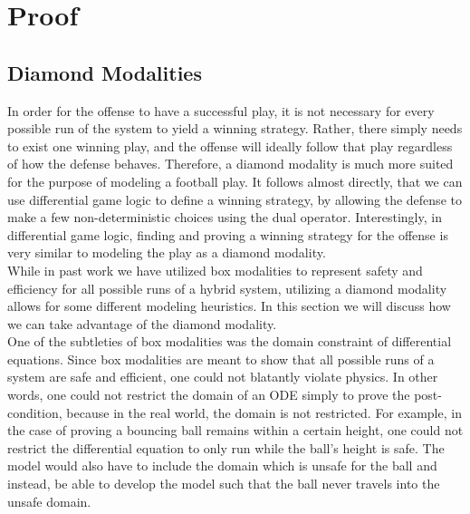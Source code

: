 \newpage


\section{Proof}

\subsection{Diamond Modalities}
\quad In order for the offense to have a successful play, it is not necessary for every possible run of the system to yield a winning strategy. Rather, there simply needs to exist one winning play, and the offense will ideally follow that play regardless of how the defense behaves. Therefore, a diamond modality is much more suited for the purpose of modeling a football play. It follows almost directly, that we can use differential game logic to define a winning strategy, by allowing the defense to make a few non-deterministic choices using the dual operator. Interestingly, in differential game logic, finding and proving a winning strategy for the offense is very similar to modeling the play as a diamond modality. \\

While in past work we have utilized box modalities to represent safety and efficiency for all possible runs of a hybrid system, utilizing a diamond modality allows for some different modeling heuristics. In this section we will discuss how we can take advantage of the diamond modality. \\

One of the subtleties of box modalities was the domain constraint of differential equations. Since box modalities are meant to show that all possible runs of a system are safe and efficient, one could not blatantly violate physics. In other words, one could not restrict the domain of an ODE simply to prove the post-condition, because in the real world, the domain is not restricted. For example, in the case of proving a bouncing ball remains within a certain height, one could not restrict the differential equation to only run while the ball’s height is safe. The model would also have to include the domain which is unsafe for the ball and instead, be able to develop the model such that the ball never travels into the unsafe domain. \\


